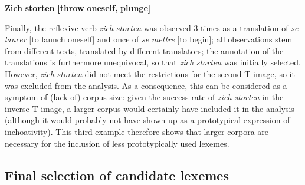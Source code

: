 \textbf{Zich} \textbf{storten} \textbf{[throw} \textbf{oneself,} \textbf{plunge]}



Finally, the reflexive verb \textit{zich} \textit{storten} was observed 3 times as a translation of \textit{se} \textit{lancer} [to launch oneself] and once of \textit{se} \textit{mettre} [to begin]; all observations stem from different texts, translated by different translators; the annotation of the translations is furthermore unequivocal, so that \textit{zich} \textit{storten} was initially selected. However, \textit{zich} \textit{storten} did not meet the restrictions for the second T-image, so it was excluded from the analysis. As a consequence, this can be considered as a symptom of (lack of) corpus size: given the success rate of \textit{zich} \textit{storten} in the inverse T-image, a larger corpus would certainly have included it in the analysis (although it would probably not have shown up as a prototypical expression of inchoativity). This third example therefore shows that larger corpora are necessary for the inclusion of less prototypically used lexemes.


\subsection{\label{sec:3.6.4}  Final selection of candidate lexemes}

